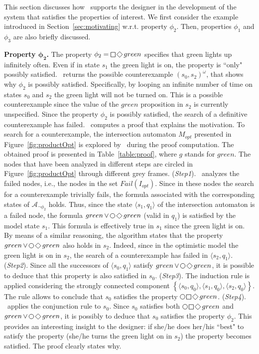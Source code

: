 This section discusses how \NAME\ supports the designer in the development of the system that satisfies the properties of interest.
We first consider the example introduced in Section~\ref{sec:motivating} w.r.t. property $\phi_2$. Then, properties $\phi_1$ and $\phi_3$ are also briefly discussed.


\textbf{Property $\boldsymbol{\phi_2}$.} 
The property $\phi_2=\LTLglobally \LTLfinally green$ specifies that green lights up infinitely often.
Even if in state $s_1$ the green light is on, the property is ``only" possibly satisfied.
\NAME\ returns the possible counterexample $(s_0, s_2)^\omega$, that shows why $\phi_2$ is possibly satisfied.
Specifically,  by looping an infinite number of time on states $s_0$ and $s_2$ the green light will not be turned on.
This is a possible counterexample since the value of the $green$ proposition in $s_2$ is currently unspecified.
Since the property $\phi_2$ is possibly satisfied, the search of a definitive counterexample has failed.
\NAME\ computes a proof that explains the motivation.
To search for a counterexample, the intersection automaton $M_{opt}$ presented in Figure~\ref{fig:productOpt} is explored by \NAME\ during the proof computation. The obtained proof is presented in Table~\ref{table:proof}, where $g$ stands for $green$.
The nodes that have been analyzed in different steps are circled  in Figure~\ref{fig:productOpt} through different grey frames.
(\emph{Step1}). \NAME\ analyzes the failed nodes, i.e., the nodes in the set $Fail(I_{opt})$.
Since in these nodes the search for a counterexample trivially fails, the formula associated with the corresponding states of $\mathcal{A}_{\lnot\phi_2}$ holds.
Thus, since the state $\langle s_1, q_1 \rangle$ of the intersection automaton is a failed node, the formula $green \LTLor \LTLnext \LTLfinally green$ (valid in $q_1$) is satisfied by the model state $s_1$.
This formula is effectively true in $s_1$ since the green light is on.
By means of a similar reasoning, the algorithm states that the property  $green \LTLor \LTLnext \LTLfinally green$ also holds in $s_2$. Indeed, since in the optimistic model the green light is on in $s_2$, the search of a counterexample has failed in $\langle s_2, q_1 \rangle$.
(\emph{Step2}). Since all the successors of $\langle s_0, q_1 \rangle$ satisfy $green \LTLor \LTLnext \LTLfinally green$, it is possible to deduce that this property is also satisfied in $s_0$.
(\emph{Step3}). The induction rule is applied considering the strongly connected component  $\left \{ \langle s_0, q_0 \rangle, \langle s_1, q_0 \rangle, \langle s_2, q_0 \rangle \right \}$.
The rule allows to conclude that $s_0$ satisfies the property $\LTLnext \LTLglobally \LTLfinally green$.
(\emph{Step4}). \NAME\ applies the conjunction rule to $s_0$.
Since $s_0$ satisfies both $\LTLnext \LTLglobally \LTLfinally green$ and $green \LTLor \LTLnext \LTLfinally green$, it is possibly to deduce that $s_0$ satisfies the property $\phi_2$.
This provides an interesting insight to the designer: if she/he does her/his ``best" to satisfy the property (she/he turns the green light on in $s_2$) the property becomes satisfied. The proof clearly states why.


